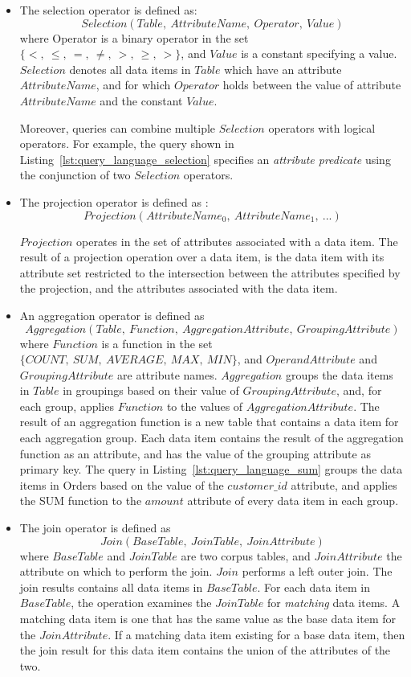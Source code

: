 \begin{itemize}
  \item The selection operator is defined as:
  \[
  Selection(Table,~AttributeName,~Operator,~Value)
  \]
  where Operator is a binary operator in the set $\{<,~\leq,~=,~\neq,~>,~\geq,~>\}$,
  and $Value$ is a constant specifying a value.
  $Selection$ denotes all data items in $Table$ which
  have an attribute $AttributeName$,
  and for which $Operator$ holds between the value of attribute $AttributeName$ and the constant $Value$.

  Moreover, queries can combine multiple $Selection$ operators with logical operators.
  For example, the query shown in Listing~\ref{lst:query_language_selection}
  specifies an \textit{attribute predicate} using the conjunction of two $Selection$ operators.

  \item The projection operator is defined as :
  \[
  Projection(AttributeName_0,~AttributeName_1,~...)
  \]

  $Projection$ operates in the set of attributes associated with a data item.
  The result of a projection operation over a data item, is the data item with its attribute set restricted to the
  intersection between the attributes specified by the projection, and the attributes associated with the data item.

  \item An aggregation operator is defined as
  \[
  Aggregation(Table,~Function,~AggregationAttribute,~GroupingAttribute)
  \]
  where $Function$ is a function in the set $\{COUNT,~SUM,~AVERAGE,~MAX,~MIN\}$,
  and $OperandAttribute$ and $GroupingAttribute$ are attribute names.
  $Aggregation$ groups the data items in $Table$ in groupings based on their value of $GroupingAttribute$,
  and, for each group, applies $Function$ to the values of $AggregationAttribute$.
  The result of an aggregation function is a new table that contains a data item for each aggregation group.
  Each data item contains the result of the aggregation function as an attribute, and has the value of the grouping attribute as primary key.
  The query in Listing~\ref{lst:query_language_sum}
  groups the data items in Orders based on the value of the $customer\_id$ attribute,
  and applies the SUM function to the $amount$ attribute of every data item in each group.

  \item The join operator is defined as
  \[
  Join(BaseTable,~JoinTable,~JoinAttribute)
  \]
  where $BaseTable$ and $JoinTable$ are two corpus tables, and $JoinAttribute$ the attribute on which to perform the join.
  $Join$ performs a left outer join.
  The join results contains all data items in $BaseTable$.
  For each data item in $BaseTable$, the operation examines the $JoinTable$ for \textit{matching} data items.
  A matching data item is one that has the same value as the base data item for the $JoinAttribute$.
  If a matching data item existing for a base data item, then the join result for this data item contains the union of the attributes of the two.


\end{itemize}
